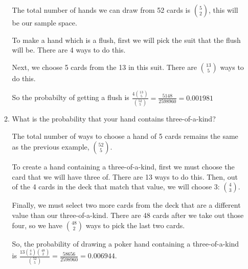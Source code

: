 \documentclass{article}
\begin{document}
\begin{enumerate}
\begin{enumerate}[label= (\alph*)]
                The total number of hands we can draw from 52 cards is $5\choose2$, 
                this will be our sample space.

                To make a hand which is a flush, first we will pick the suit that the flush
                will be. There are 4 ways to do this.

                Next, we choose 5 cards from the 13 in this suit. There are $13\choose5$ ways to 
                do this.

                So the probabilty of getting a flush is $\frac{4{13\choose5}}{{52\choose5}}=\frac{5148}{2598960}=0.001981$

                \item What is the probability that your hand contains three-of-a-kind?
                
                The total number of ways to choose a hand of 5 cards remains the same as the previous example, $52\choose5$.

                To create a hand containing a three-of-a-kind, first we must choose the card that we will have three of. There are 13 ways to do this. Then, out of the 4 cards in the deck that match that value, we will choose 3: $4\choose3$. 

                Finally, we must select two more cards from the deck that are a different value than our three-of-a-kind. There are 48 cards after we take out those four, so we have $48\choose2$ ways to pick the last two cards.

                So, the probability of drawing a poker hand containing a three-of-a-kind is $\frac{13{4\choose3}{48\choose2}}{{52\choose5}}=\frac{58656}{2598960}=0.006944$.
            \end{enumerate}
\end{enumerate}
\end{document}
